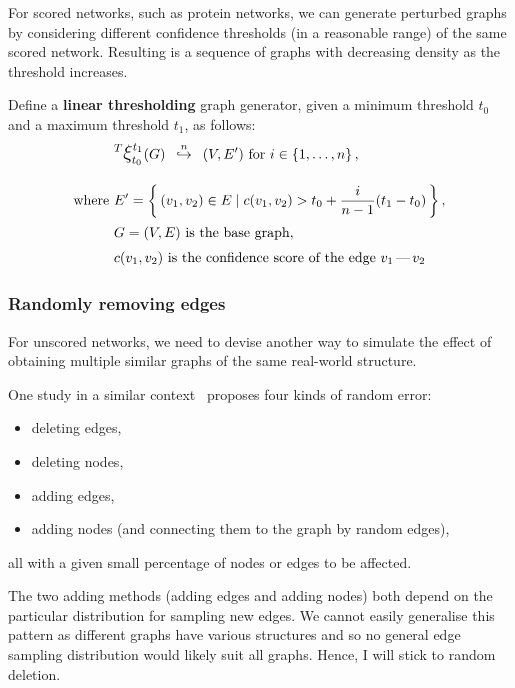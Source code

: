 For scored networks, such as protein networks, we can generate perturbed graphs by considering different confidence thresholds (in a reasonable range) of the same scored network.
Resulting is a sequence of graphs with decreasing density as the threshold increases.

Define a \textbf{linear thresholding} graph generator, given a minimum threshold $t_0$ and a maximum threshold $t_1$, as follows:
\begin{align}
    &\mathlarger{^T \mathlarger{\xi}}_{t_0}^{t_1}(G) \generates{n} (V, E')~\text{for}~i\in \integersto{n}, \\[10pt]
    \text{where}~&E' = \Set{(v_1, v_2)\in E}{ c(v_1, v_2) > t_0 + \frac{i}{n - 1}(t_1 - t_0) }, \nonumber \\
    &G = (V, E)~\text{is the base graph}, \nonumber \\
    &c(v_1, v_2)~\text{is the confidence score of the edge $v_1\,\text{---}\,v_2$} \nonumber
\end{align}


\subsubsection{Randomly removing edges}\label{sec:randomly_removing_edges}

For unscored networks, we need to devise another way to simulate the effect of obtaining multiple similar graphs of the same real-world structure.

One study in a similar context~\cite{BorgattiRobustnessCentralityMeasures2006} proposes four kinds of random error:
\begin{itemize}[topsep=5pt]
    \item deleting edges,
    \item deleting nodes,
    \item adding edges,
    \item adding nodes (and connecting them to the graph by random edges),
\end{itemize}
all with a given small percentage of nodes or edges to be affected.

The two adding methods (adding edges and adding nodes) both depend on the particular distribution for sampling new edges.
We cannot easily generalise this pattern as different graphs have various structures and so no general edge sampling distribution would likely suit all graphs.
Hence, I will stick to random deletion.

